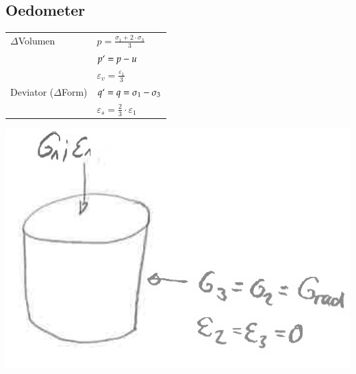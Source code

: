 	
	\begin{minipage}{0.35\linewidth}
\subsection{Oedometer}
\begin{tabular}{ll}
		$\Delta$Volumen		& $p= \frac{\sigma_1 + 2 \cdot \sigma_3}{3}$ \\
							& $p`= p - u$ \\
							& $\varepsilon_v= \frac{\varepsilon_1}{3}$ \\
		Deviator ($\Delta$Form) &$q`= q = \sigma_1 - \sigma_3$ \\
							& $\varepsilon_s= \frac{2}{3} \cdot \varepsilon_1$ \\
	\end{tabular}
\end{minipage}
\begin{minipage}{0.5\linewidth}
	\includegraphics[width=0.5\linewidth]{images/MC1Oed.PNG}
\end{minipage}



\clearpage



